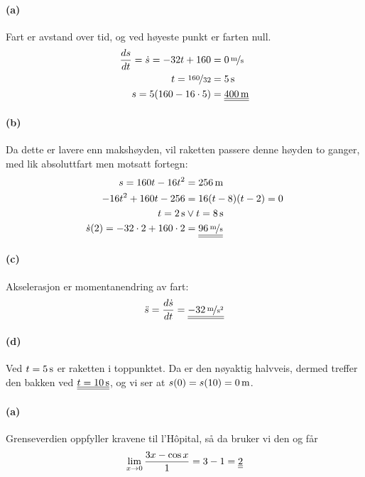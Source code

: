 \documentclass[a4paper,norsk,12pt]{article}
\begin{document}
\paragraph{(a)}
Fart er avstand over tid, og ved høyeste punkt er farten null.
\begin{align*}
  \frac{ds}{dt} = \dot{s} = -32t + 160 & = \unitfrac[0]{m}{s} \\
  t = \nicefrac{160}{32} & = \unit[5]{s} \\
  s = 5(160-16\cdot5) & = \svar{\unit[400]{m}}
\end{align*}

\paragraph{(b)}
Da dette er lavere enn makshøyden, vil raketten passere denne høyden to ganger,
med lik absoluttfart men motsatt fortegn:
\begin{align*}
  s  = 160t-16t^2 & = \unit[256]{m} \\
  -16t^2+160t-256 & = 16(t-8)(t-2) = 0 \\
  t = \unit[2]{s} & \vee t = \unit[8]{s} \\
  \dot{s}(2) = -32\cdot2 + 160\cdot2 & = \svar{\unitfrac[96]{m}{s}}
\end{align*}

\paragraph{(c)}
Akselerasjon er momentanendring av fart:
\begin{align*}
  \ddot{s} = \frac{d\dot{s}}{dt} = \svar{\unitfrac[-32]{m}{s^2}}
\end{align*}

\paragraph{(d)}
Ved $t=\unit[5]{s}$ er raketten i toppunktet. Da er den nøyaktig halvveis,
dermed treffer den bakken ved $\svar{t=\unit[10]{s}}$, og vi ser at
$s(0) = s(10) = \unit[0]{m}$.

\paragraph{(a)}
Grenseverdien oppfyller kravene til l'Hôpital, så da bruker vi den og får
\begin{align*}
  \lim_{x\to 0}{\frac{3x-\cos{x}}{1}} = 3 - 1 = {\underline{\underline{2}}}
\end{align*}
\end{document}
